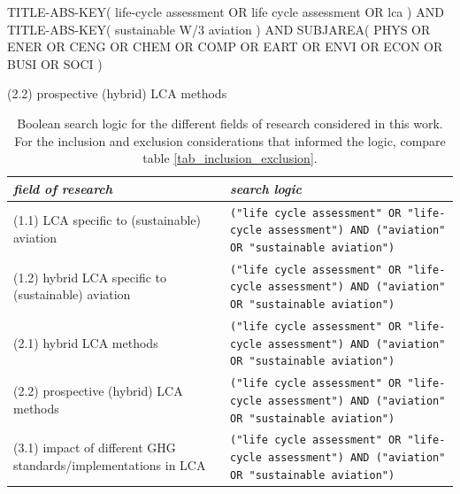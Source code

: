 \documentclass{article}
\begin{document}
            
\begin{code_search}
TITLE-ABS-KEY(
    {life-cycle assessment}
    OR
    {life cycle assessment}
    OR
    {lca}
)
AND TITLE-ABS-KEY(
    sustainable W/3 aviation
)
AND SUBJAREA(
    PHYS OR ENER OR CENG OR CHEM OR COMP OR EART OR ENVI OR
    ECON OR BUSI OR SOCI
)
\end{code_search}
            
            (2.2) prospective (hybrid) LCA methods
            

            \begin{table}[htbp]
                \centering
                \begin{tabularx}{\textwidth}{| X | X |}
                    \hline
                    \textit{field of research} & \textit{search logic} \\
                    \hline
                    (1.1) LCA specific to (sustainable) aviation & \texttt{("life cycle assessment" OR "life-cycle assessment") AND ("aviation" OR "sustainable aviation")} \\
                    \hline
                    (1.2) hybrid LCA specific to (sustainable) aviation &  \texttt{("life cycle assessment" OR "life-cycle assessment") AND ("aviation" OR "sustainable aviation")} \\
                    \hline
                    (2.1) hybrid LCA methods & \texttt{("life cycle assessment" OR "life-cycle assessment") AND ("aviation" OR "sustainable aviation")} \\
                    \hline
                    (2.2) prospective (hybrid) LCA methods & \texttt{("life cycle assessment" OR "life-cycle assessment") AND ("aviation" OR "sustainable aviation")} \\
                    \hline
                    (3.1) impact of different GHG standards/implementations in LCA & \texttt{("life cycle assessment" OR "life-cycle assessment") AND ("aviation" OR "sustainable aviation")} \\
                    \hline
                \end{tabularx}
                \caption{Boolean search logic for the different fields of research considered in this work. For the inclusion and exclusion considerations that informed the logic, compare table \ref{tab_inclusion_exclusion}.}
                \label{tab_bool}
            \end{table}
            
        

\newpage



\end{document}
